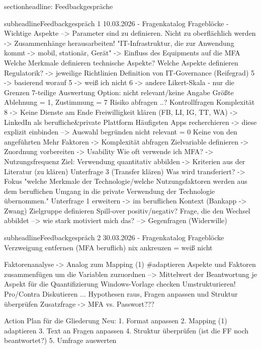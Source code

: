 section{headline: Feedbackgespräche}

subheadline{Feedbackgespräch 1 10.03.2026 - Fragenkatalog}
Frageblöcke - Wichtige Aspekte --> Parameter sind zu definieren.
Nicht zu oberflächlich werden -> Zusammenhänge herausarbeiten!
"IT-Infrastruktur, die zur Anwendung kommt -> mobil, stationär, Gerät" -> Einfluss des Equipments auf die MFA
Welche Merkmale definieren technische Aspekte? Welche Aspekte definieren Regulatorik? -> jeweilige Richtlinien
Definition von IT-Governance (Reifegrad)
5 -> basierend worauf
5 -> weiß ich nicht
6 -> andere
Likert-Skala - nur die Grenzen
7-teilige Auswertung
Option: nicht relevant/keine Angabe
Größte Ablehnung = 1, Zustimmung = 7
Risiko abfragen ..? Kontrollfragen
Komplexität
8 -> Keine Dienste am Ende
Freiwilligkeit klären (FB, LI, IG, TT, WA)
-> LinkedIn als berufliche&private Plattform
Häufigsten Apps recherchieren -> diese explizit einbinden --> Auswahl begründen
nicht relevant = 0
Keine von den angeführten
Mehr Faktoren -> Komplexität abfragen
Zielvariable definieren -> 
Zuordnung vorbereiten -> Usability
Wie oft verwende ich MFA? -> Nutzungsfrequenz
Ziel: Verwendung quantitativ abbilden -> Kriterien aus der Literatur (zu klären)
Unterfrage 3 (Transfer klären) Was wird transferiert? -> Fokus "welche Merkmale der Technologie/welche Nutzungsfaktoren werden aus dem beruflichen Umgang in die private Verwendung der Technologie übernommen."
Unterfrage 1 erweitern ->  im beruflichen Kontext (Bankapp -> Zwang)
Zielgruppe definieren
Spill-over positiv/negativ? 
Frage, die den Wechsel abbildet --> wie stark motiviert mich das? --> Gegenfragen (Widerwille)

subheadline{Feedbackgespräch 2 30.03.2026 - Fragenkatalog}
Frageblöcke
Verzweigung entfernen (MFA beruflich)
nix ankreuzen = weiß nicht

Faktorenanalyse  -> Analog zum Mapping (1) #adaptieren
Aspekte und Faktoren zusammenfügen um die Variablen zuzuordnen
--> Mittelwert der Beantwortung je Aspekt für die Quantifizierung
Windows-Vorlage checken
Umstrukturieren! Pro/Contra Diskutieren ... 
Hypothesen raus, Fragen anpassen und Struktur überprüfen
Zusatzfrage -> MFA vs. Passwort???

Action Plan für die Gliederung Neu:
1. Format anpassen
2. Mapping (1) adaptieren
3. Text an Fragen anpassen
4. Struktur überprüfen (ist die FF noch beantwortet?)
5. Umfrage auswerten
